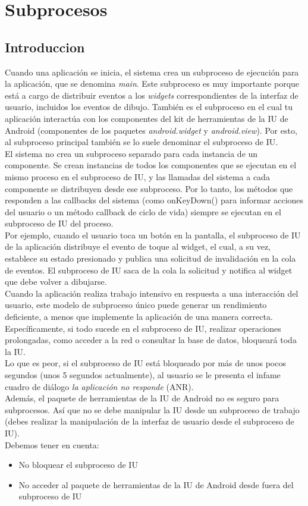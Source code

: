 \documentclass[4paper]{article}
\begin{document}
\newpage


\section{Subprocesos}
\subsection{Introduccion}
Cuando una aplicación se inicia, el sistema crea un subproceso de ejecución para la aplicación, que se denomina \emph{main}. Este subproceso es muy importante porque está a cargo de distribuir eventos a los \emph{widgets} correspondientes de la interfaz de usuario, incluidos los eventos de dibujo. También es el subproceso en el cual tu aplicación interactúa con los componentes del kit de herramientas de la IU de Android (componentes de los paquetes \emph{android.widget} y \emph{android.view}). Por esto, al subproceso principal también se lo suele denominar el subproceso de IU.\\
El sistema no crea un subproceso separado para cada instancia de un componente. Se crean instancias de todos los componentes que se ejecutan en el mismo proceso en el subproceso de IU, y las llamadas del sistema a cada componente se distribuyen desde ese subproceso. Por lo tanto, los métodos que responden a las callbacks del sistema (como onKeyDown() para informar acciones del usuario o un método callback de ciclo de vida) siempre se ejecutan en el subproceso de IU del proceso.\\
Por ejemplo, cuando el usuario toca un botón en la pantalla, el subproceso de IU de la aplicación distribuye el evento de toque al widget, el cual, a su vez, establece su estado presionado y publica una solicitud de invalidación en la cola de eventos. El subproceso de IU saca de la cola la solicitud y notifica al widget que debe volver a dibujarse.\\
Cuando la aplicación realiza trabajo intensivo en respuesta a una interacción del usuario, este modelo de subproceso único puede generar un rendimiento deficiente, a menos que implemente la aplicación de una manera correcta.\\
Específicamente, si todo sucede en el subproceso de IU, realizar operaciones prolongadas, como acceder a la red o consultar la base de datos, bloqueará toda la IU. \\
Lo que es peor, si el subproceso de IU está bloqueado por más de unos pocos segundos (unos 5 segundos actualmente), al usuario se le presenta el infame cuadro de diálogo \emph{la aplicación no responde} (ANR).\\
Además, el paquete de herramientas de la IU de Android no es seguro para subprocesos. Así que no se debe manipular la IU desde un subproceso de trabajo (debes realizar la manipulación de la interfaz de usuario desde el subproceso de IU).\\
Debemos tener en cuenta:
\begin{itemize}
\item No bloquear el subproceso de IU
\item No acceder al paquete de herramientas de la IU de Android desde fuera del subproceso de IU
\end{itemize}
\end{document}

